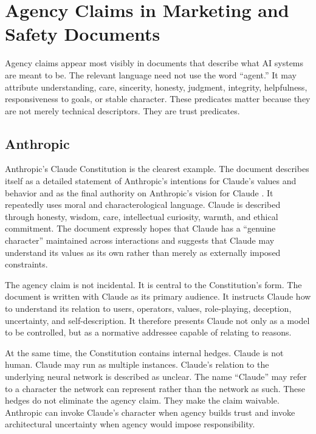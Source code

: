 \documentclass[11pt,a4paper]{article}
\begin{document}
\section{Agency Claims in Marketing and Safety Documents}

Agency claims appear most visibly in documents that describe what AI systems are meant to be. The relevant language need not use the word ``agent.'' It may attribute understanding, care, sincerity, honesty, judgment, integrity, helpfulness, responsiveness to goals, or stable character. These predicates matter because they are not merely technical descriptors. They are trust predicates.

\subsection{Anthropic}

Anthropic's Claude Constitution is the clearest example. The document describes itself as a detailed statement of Anthropic's intentions for Claude's values and behavior and as the final authority on Anthropic's vision for Claude \citep{anthropic2026constitution}. It repeatedly uses moral and characterological language. Claude is described through honesty, wisdom, care, intellectual curiosity, warmth, and ethical commitment. The document expressly hopes that Claude has a ``genuine character'' maintained across interactions and suggests that Claude may understand its values as its own rather than merely as externally imposed constraints.

The agency claim is not incidental. It is central to the Constitution's form. The document is written with Claude as its primary audience. It instructs Claude how to understand its relation to users, operators, values, role-playing, deception, uncertainty, and self-description. It therefore presents Claude not only as a model to be controlled, but as a normative addressee capable of relating to reasons.

At the same time, the Constitution contains internal hedges. Claude is not human. Claude may run as multiple instances. Claude's relation to the underlying neural network is described as unclear. The name ``Claude'' may refer to a character the network can represent rather than the network as such. These hedges do not eliminate the agency claim. They make the claim waivable. Anthropic can invoke Claude's character when agency builds trust and invoke architectural uncertainty when agency would impose responsibility.
\end{document}

